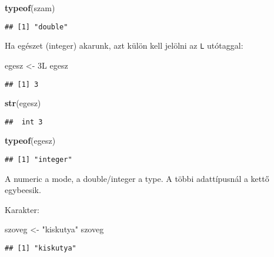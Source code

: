 \documentclass[]{book}
\newenvironment{Shaded}{\begin{snugshade}}{\end{snugshade}}
\newcommand{\KeywordTok}[1]{\textcolor[rgb]{0.13,0.29,0.53}{\textbf{#1}}}
\newcommand{\StringTok}[1]{\textcolor[rgb]{0.31,0.60,0.02}{#1}}
\newcommand{\NormalTok}[1]{#1}
\begin{document}
\begin{Shaded}
\begin{Highlighting}[]
\KeywordTok{typeof}\NormalTok{(szam)}
\end{Highlighting}
\end{Shaded}

\begin{verbatim}
## [1] "double"
\end{verbatim}

Ha egészet (integer) akarunk, azt külön kell jelölni az \texttt{L}
utótaggal:

\begin{Shaded}
\begin{Highlighting}[]
\NormalTok{egesz <-}\StringTok{ }\NormalTok{3L}
\NormalTok{egesz}
\end{Highlighting}
\end{Shaded}

\begin{verbatim}
## [1] 3
\end{verbatim}

\begin{Shaded}
\begin{Highlighting}[]
\KeywordTok{str}\NormalTok{(egesz)}
\end{Highlighting}
\end{Shaded}

\begin{verbatim}
##  int 3
\end{verbatim}

\begin{Shaded}
\begin{Highlighting}[]
\KeywordTok{typeof}\NormalTok{(egesz)}
\end{Highlighting}
\end{Shaded}

\begin{verbatim}
## [1] "integer"
\end{verbatim}

A numeric a mode, a double/integer a type. A többi adattípusnál a kettő
egybeesik.

Karakter:

\begin{Shaded}
\begin{Highlighting}[]
\NormalTok{szoveg <-}\StringTok{ "kiskutya"}
\NormalTok{szoveg}
\end{Highlighting}
\end{Shaded}

\begin{verbatim}
## [1] "kiskutya"
\end{verbatim}
\end{document}
